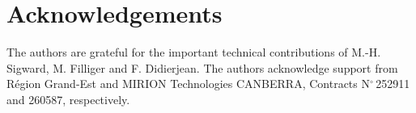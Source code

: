 \section{Acknowledgements}
\label{sec:acknowledgements}
The authors are grateful for the important technical contributions of M.-H. Sigward, M. Filliger and F. Didierjean. The authors acknowledge support from Région Grand-Est and MIRION Technologies CANBERRA, Contracts N$^\circ$\,252911 and 260587, respectively.

%





